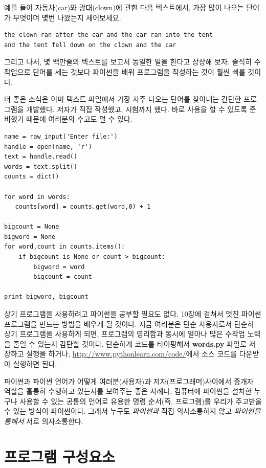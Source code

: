 예를 들어 자동차(car)와 광대(clown)에 관한 다음 텍스트에서, 가장 많이 나오는 단어가 무엇이며 몇번 나왔는지 세어보세요.

\beforeverb
\begin{verbatim}
the clown ran after the car and the car ran into the tent 
and the tent fell down on the clown and the car 
\end{verbatim}
\afterverb
%

그리고 나서, 몇 백만줄의 텍스트를 보고서 동일한 일을 한다고 상상해 보자. 
솔직히 수작업으로 단어를 세는 것보다 파이썬을 배워 프로그램을 작성하는 것이 훨씬 빠를 것이다.

더 좋은 소식은 이미 텍스트 파일에서 가장 자주 나오는 단어를 찾아내는 간단한 프로그램을 개발했다. 저자가 직접 작성했고, 시험까지 했다. 
바로 사용을 할 수 있도록 준비했기 때문에 여러분의 수고도 덜 수 있다.

\beforeverb
\begin{verbatim}
name = raw_input('Enter file:')
handle = open(name, 'r')
text = handle.read()
words = text.split()
counts = dict()

for word in words:
   counts[word] = counts.get(word,0) + 1

bigcount = None
bigword = None
for word,count in counts.items():
    if bigcount is None or count > bigcount:
        bigword = word
        bigcount = count

print bigword, bigcount
\end{verbatim}
\afterverb
%

상기 프로그램을 사용하려고 파이썬을 공부할 필요도 없다. 
10장에 걸쳐서 멋진 파이썬 프로그램을 만드는 방법을 배우게 될 것이다. 
지금 여러분은 단순 사용자로서 단순히 상기 프로그램을 사용하게 되면, 프로그램의 영리함과 동시에 얼마나 많은 수작업 노력을 줄일 수 있는지 감탄할 것이다.
단순하게 코드를 타이핑해서 {\bf words.py} 파일로 저장하고 실행을 하거나, \url{http://www.pythonlearn.com/code/}에서 소스 코드를 다운받아 실행하면 된다.


파이썬과 파이썬 언어가 어떻게 여러분(사용자)과 저자(프로그래머)사이에서 중개자 역할을 훌륭히 수행하고 있는지를 보여주는 좋은 사례다.
컴퓨터에 파이썬을 설치한 누구나 사용할 수 있는 공통의 언어로 유용한 명령 순서(즉, 프로그램)를 우리가 주고받을 수 있는 방식이 파이썬이다.
그래서 누구도 {\em 파이썬과} 직접 의사소통하지 않고 {\em 파이썬을 통해서} 서로 의사소통한다.

\section{프로그램 구성요소}

